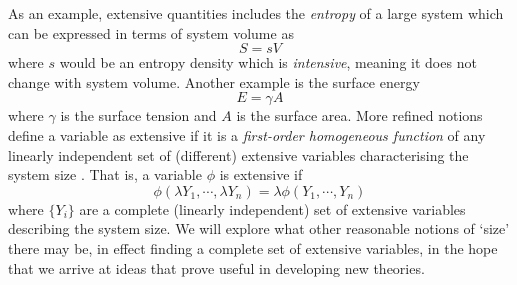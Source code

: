 As an example, extensive quantities includes the \emph{entropy} of a large system which can be expressed in terms of system volume as
\begin{equation*}
  S = s V
\end{equation*}
where $s$ would be an entropy density which is \emph{intensive}, meaning it does not change with system volume.
Another example is the surface energy
\begin{equation*}
  E = \gamma A
\end{equation*}
where $\gamma$ is the surface tension and $A$ is the surface area.
More refined notions define a variable as extensive if it is a \emph{first-order homogeneous function} of any linearly independent set of (different) extensive variables characterising the system size \cite{Chandler1987}.
That is, a variable $\phi$ is extensive if
\begin{equation}\label{eq:extensive-homogeneity}
  \phi(\lambda Y_1, \cdots, \lambda Y_n)
  =
  \lambda \phi(Y_1, \cdots, Y_n)
\end{equation}
where $\{Y_i\}$ are a complete (linearly independent) set of extensive variables describing the system size.
We will explore what other reasonable notions of `size' there may be, in effect finding a complete set of extensive variables, in the hope that we arrive at ideas that prove useful in developing new theories.

